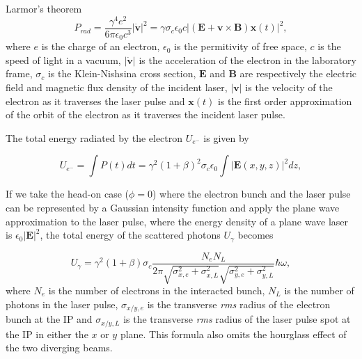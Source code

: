\documentclass[../main.tex]{subfiles}
\begin{document}
Larmor's theorem
\begin{equation}
P_{rad} = \frac{\gamma^{4}e^{2}}{6\pi \epsilon_{0}c^{3}}\lvert\mathbf{\dot{v}}\rvert^{2} = \gamma\sigma_{c}\epsilon_{0}c\lvert\left(\mathbf{E}+\mathbf{v}\times\mathbf{B}\right)\mathbf{x}\left(t\right)\rvert^{2},
\label{eq:larmor_formula}    
\end{equation}
where $e$ is the charge of an electron,  $\epsilon_{0}$ is the permitivity of free space, $c$ is the speed of light in a vacuum, $\lvert\mathbf{\dot{v}}\rvert$ is the acceleration of the electron in the laboratory frame, $\sigma_{c}$ is the Klein-Nishsina cross section, $\mathbf{E}$ and $\mathbf{B}$ are respectively the electric field and magnetic flux density of the incident laser, $\lvert\mathbf{v}\rvert$ is the velocity of the electron as it traverses the laser pulse and $\mathbf{x}\left(t\right)$ is the first order approximation of the orbit of the electron as it traverses the incident laser pulse. 

The total energy radiated by the electron $U_{e^{-}}$ is given by

\begin{equation}
U_{e^{-}} = \int P\left(t\right)dt = \gamma^{2}\left(1+\beta\right)^{2}\sigma_{c}\epsilon_{0}\int\lvert\mathbf{E}\left(x,y,z\right)\rvert^{2}dz,
\label{eq:electron_radiated_energy}
\end{equation}

If we take the head-on case ($\phi=0$) where the electron bunch and the laser pulse can be represented by a Gaussian intensity function and apply the plane wave approximation to the laser pulse, where the energy density of a plane wave laser is $\epsilon_{0}\lvert\mathbf{E}\rvert^{2}$, the total energy of the scattered photons $U_{\gamma}$ becomes

\begin{equation}
U_{\gamma} = \gamma^{2}\left(1+\beta\right)\sigma_{c}\frac{N_{e}N_{L}}{2\pi\sqrt{\sigma_{x,e}^{2}+\sigma_{x,L}^2}\sqrt{\sigma_{y,e}^{2}+\sigma_{y,L}^{2}}}\hbar\omega,
\label{eq:total_interaction_energy}
\end{equation}
where $N_{e}$ is the number of electrons in the interacted bunch, $N_{L}$ is the number of photons in the laser pulse, $\sigma_{x/y,e}$ is the transverse \textit{rms} radius of the electron bunch at the IP and $\sigma_{x/y,L}$ is the transverse \textit{rms} radius of the laser pulse spot at the IP in either the $x$ or $y$ plane. This formula also omits the hourglass effect of the two diverging beams.
\end{document}
